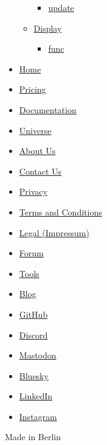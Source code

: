 \begin{itemize}
\begin{itemize}
    \begin{itemize}
    \tightlist
    \item
      \hyperref[definitions-update-update]{update}
    \end{itemize}
  \item
    \hyperref[definitions-display]{Display}

    \begin{itemize}
    \tightlist
    \item
      \hyperref[definitions-display-func]{func}
    \end{itemize}
  \end{itemize}
\end{itemize}

\begin{itemize}
\tightlist
\item
  \href{/}{Home}
\item
  \href{/pricing/}{Pricing}
\item
  \href{/docs/}{Documentation}
\item
  \href{/universe/}{Universe}
\item
  \href{/about/}{About Us}
\item
  \href{/contact/}{Contact Us}
\item
  \href{/privacy/}{Privacy}
\item
  \href{https://typst.app/terms}{Terms and Conditions}
\item
  \href{/legal/}{Legal (Impressum)}
\end{itemize}

\begin{itemize}
\tightlist
\item
  \href{https://forum.typst.app}{Forum}
\item
  \href{/tools/}{Tools}
\item
  \href{/blog/}{Blog}
\item
  \href{https://github.com/typst/}{GitHub}
\item
  \href{https://discord.gg/2uDybryKPe}{Discord}
\item
  \href{https://mastodon.social/@typst}{Mastodon}
\item
  \href{https://bsky.app/profile/typst.app}{Bluesky}
\item
  \href{https://www.linkedin.com/company/typst/}{LinkedIn}
\item
  \href{https://instagram.com/typstapp/}{Instagram}
\end{itemize}

Made in Berlin
